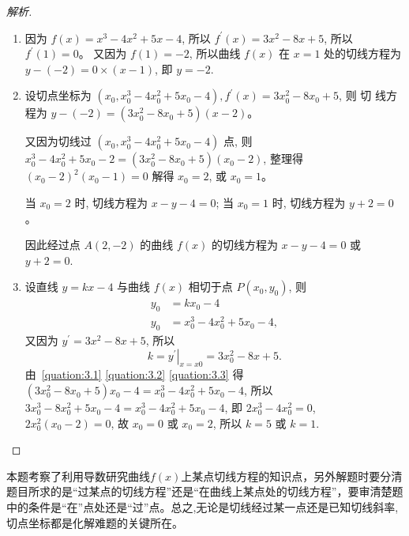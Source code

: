 \begin{proof}[解析]
  \begin{enumerate}[(1)]
    \item 因为 $f(x)=x^{3}-4 x^{2}+5 x-4$, 所以 $f^{\prime}(x)=3 x^{2}-8 x+5$, 所以 $f^{\prime}(1)=0$。
    又因为 $f(1)=-2$,
    所以曲线 $f(x)$ 在 ${x}=1$ 处的切线方程为 $y-(-2)=0 \times(x-1)$, 即 ${y}=-2$.
    \item 设切点坐标为 $\left(x_{0}, x_{0}^{3}-4 x_{0}^{2}+5 x_{0}-4\right), f^{\prime}(x)=3 x_{0}^{2}-8 x_{0}+5$, 则 切 线方程为 $y-(-2)=\left(3 x_{0}^{2}-8 x_{0}+5\right)(x-2)$。
    
    又因为切线过 $\left(x_{0}, x_{0}^{3}-4 x_{0}^{2}+5 x_{0}-4\right)$ 点,
    则 $x_{0}^{3}-4 x_{0}^{2}+5 x_{0}-2=\left(3 x_{0}^{2}-8 x_{0}+5\right)\left(x_{0}-2\right)$, 整理得 $\left(x_{0}-2\right)^{2}\left(x_{0}-1\right)=0$
    解得 $x_{0}=2$, 或 $x_{0}=1$。

    当 $x_{0}=2$ 时, 切线方程为 $x-y-4=0$;
    当 $x_{0}=1$ 时, 切线方程为 $y+2=0$。

    因此经过点 $A(2,-2)$ 的曲线 $f(x)$ 的切线方程为 $x-y-4=0$ 或 $y+2=0$.
    \item 设直线 $y=k x-4$ 与曲线 $f(x)$ 相切于点 $P\left(x_{0}, y_{0}\right)$,
    则
    \begin{align}
      {y}_{0}&={kx}_{0}-4  \label{quation:3.1}\\
      {y}_{0}&={x}_{0}^{3}-4 {x}_{0}^{2}+5 {x}_{0}-4,\label{quation:3.2}
    \end{align}
    又因为 $y^{\prime}=3 x^{2}-8 x+5$,
    所以 
    \begin{equation}\label{quation:3.3}
      k=\left.y^{\prime}\right|_{x=x 0}=3 x_{0}^{2}-8 x+5.
    \end{equation}
    由~\eqref{quation:3.1} \eqref{quation:3.2} \eqref{quation:3.3} 得 $\left(3 x_{0}^{2}-8 x_{0}+5\right) x_{0}-4=x_{0}^{3}-4 x_{0}^{2}+5 x_{0}-4$,
    所以 $3 {x}_{0}^{3}-8 {x}_{0}^{2}+5 {x}_{0}-4={x}_{0}^{3}-4 {x}_{0}^{2}+5 {x}_{0}-4$,
    即 $2 {x}_{0}^{3}-4 {x}_{0}^{2}=0$,
    $2 {x}_{0}^{2}\left({x}_{0}-2\right)=0$,
    故 $x_{0}=0$ 或 $x_{0}=2$,
    所以 $k=5$ 或 $k=1$. \qedhere
  \end{enumerate}
\end{proof}

\begin{review}
  本题考察了利用导数研究曲线$f(x)$上某点切线方程的知识点，另外解题时要分清题目所求的是“过某点的切线方程”还是“在曲线上某点处的切线方程”，要审清楚题中的条件是“在”点处还是“过”点。总之,无论是切线经过某一点还是已知切线斜率,切点坐标都是化解难题的关键所在。
\end{review}



